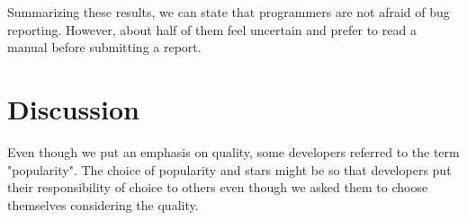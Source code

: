 \documentclass[11pt,review,sigplan,nonacm,natbib=false]{acmart}
\begin{document}

Summarizing these results, we can state that programmers are not afraid of bug reporting. However, about half of them feel uncertain and prefer to read a manual before submitting a report.

\section{Discussion}


Even though we put an emphasis on quality, some developers referred to the term "popularity". The choice of popularity and stars might be so that developers put their responsibility of choice to others even though we asked them to choose themselves considering the quality.

\end{document}

